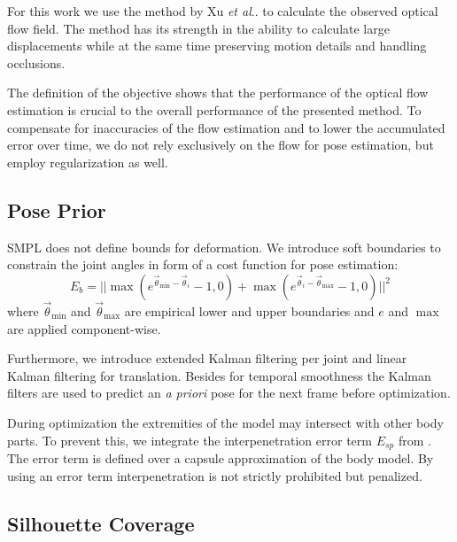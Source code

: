 \documentclass[10pt,twocolumn,letterpaper]{article}
\makeatletter
\DeclareRobustCommand\onedot{\futurelet\@let@token\@onedot}
\def\@onedot{\ifx\@let@token.\else.\null\fi\xspace}
\def\etal{\emph{et al}\onedot}
\makeatother
\begin{document}
For this work we use the method by Xu \etal \cite{xu2012motion} to calculate the observed optical flow field. The method has its strength in the ability to calculate large displacements while at the same time preserving motion details and handling occlusions.

The definition of the objective shows that the performance of the optical flow estimation is crucial to the overall performance of the presented method. To compensate for inaccuracies of the flow estimation and to lower the accumulated error over time, we do not rely exclusively on the flow for pose estimation, but employ regularization as well.

\subsection{Pose Prior}

SMPL does not define bounds for deformation. We introduce soft boundaries to constrain the joint angles in form of a cost function for pose estimation:
\begin{equation}
E_b = || \max(e^{\vec{\theta}_{\text{min}} - \vec{\theta}_i} - 1, 0) + \max(e^{\vec{\theta}_i - \vec{\theta}_{\text{max}}} - 1, 0) ||^2
\end{equation}
\noindent
where $\vec{\theta}_{\text{min}}$ and $\vec{\theta}_{\text{max}}$ are empirical lower and upper boundaries and $e$ and $\max$ are applied component-wise.

Furthermore, we introduce extended Kalman filtering per joint and linear Kalman filtering for translation. Besides for temporal smoothness the Kalman filters are used to predict an \emph{a priori} pose for the next frame before optimization.

During optimization the extremities of the model may intersect with other body parts. To prevent this, we integrate the interpenetration error term $E_{sp}$ from \cite{bogo2016smplify}. The error term is defined over a capsule approximation of the body model. By using an error term interpenetration is not strictly prohibited but penalized.


\subsection{Silhouette Coverage}

\end{document}
